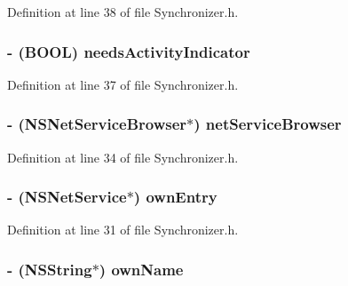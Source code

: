 Definition at line 38 of file Synchronizer.h.

\hypertarget{interface_synchronizer_ae196d598b6ad72fb9ddb5d46ed2cc9f5}{
\subsubsection[{needsActivityIndicator}]{\setlength{\rightskip}{0pt plus 5cm}-\/ (BOOL) needsActivityIndicator}}
\label{interface_synchronizer_ae196d598b6ad72fb9ddb5d46ed2cc9f5}


Definition at line 37 of file Synchronizer.h.

\hypertarget{interface_synchronizer_abf4b3c3bd472b664be35d3bfc58136cf}{
\subsubsection[{netServiceBrowser}]{\setlength{\rightskip}{0pt plus 5cm}-\/ (NSNetServiceBrowser$\ast$) netServiceBrowser}}
\label{interface_synchronizer_abf4b3c3bd472b664be35d3bfc58136cf}


Definition at line 34 of file Synchronizer.h.

\hypertarget{interface_synchronizer_a0b9cb55a24dc46c7d94cd0ca205aedae}{
\subsubsection[{ownEntry}]{\setlength{\rightskip}{0pt plus 5cm}-\/ (NSNetService$\ast$) ownEntry}}
\label{interface_synchronizer_a0b9cb55a24dc46c7d94cd0ca205aedae}


Definition at line 31 of file Synchronizer.h.

\hypertarget{interface_synchronizer_a309302494c6ea19d6c181d53684f9207}{
\subsubsection[{ownName}]{\setlength{\rightskip}{0pt plus 5cm}-\/ (NSString$\ast$) ownName}}
\label{interface_synchronizer_a309302494c6ea19d6c181d53684f9207}


